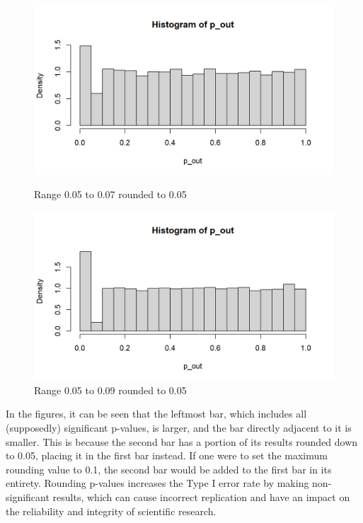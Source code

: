 \documentclass[12pt]{article}
\begin{document}
\begin{figure}[h!]
        \begin{minipage}{0.45\textwidth}
            \centering
            \includegraphics[width=\textwidth]{figures/R_plot_round3.png}
            \caption{Range 0.05 to 0.07 rounded to 0.05}
        \end{minipage} \hfill
        \begin{minipage}{0.45\textwidth}
            \centering
            \includegraphics[width=\textwidth]{figures/R_plot_round4.png}
            \caption{Range 0.05 to 0.09 rounded to 0.05}
        \end{minipage}
    \end{figure}

    In the figures, it can be seen that the leftmost bar, which includes all (supposedly) significant p-values, is larger, and the bar directly adjacent to it is smaller. This is because the second bar has a portion of its results rounded down to 0.05, placing it in the first bar instead. If one were to set the maximum rounding value to 0.1, the second bar would be added to the first bar in its entirety. Rounding p-values increases the Type I error rate by making non-significant results, which can cause incorrect replication and have an impact on the reliability and integrity of scientific research. 
\end{document}

